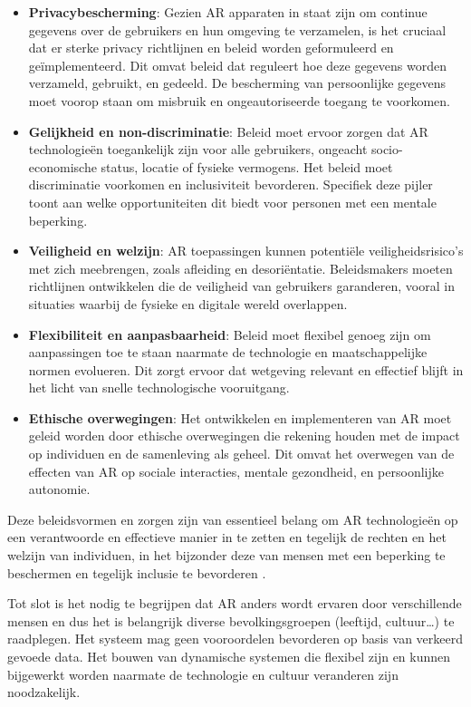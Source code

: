 \begin{itemize}
    \item \textbf{Privacybescherming}: Gezien AR apparaten in staat zijn om continue gegevens over de gebruikers en hun omgeving te verzamelen, is het cruciaal dat er sterke privacy richtlijnen en beleid worden geformuleerd en geïmplementeerd. Dit omvat beleid dat reguleert hoe deze gegevens worden verzameld, gebruikt, en gedeeld. De bescherming van persoonlijke gegevens moet voorop staan om misbruik en ongeautoriseerde toegang te voorkomen.
    \item \textbf{Gelijkheid en non-discriminatie}: Beleid moet ervoor zorgen dat AR technologieën toegankelijk zijn voor alle gebruikers, ongeacht socio-economische status, locatie of fysieke vermogens. Het beleid moet discriminatie voorkomen en inclusiviteit bevorderen. Specifiek deze pijler toont aan welke opportuniteiten dit biedt voor personen met een mentale beperking.
    \item \textbf{Veiligheid en welzijn}: AR toepassingen kunnen potentiële veiligheidsrisico's met zich meebrengen, zoals afleiding en desoriëntatie. Beleidsmakers moeten richtlijnen ontwikkelen die de veiligheid van gebruikers garanderen, vooral in situaties waarbij de fysieke en digitale wereld overlappen.
    \item \textbf{Flexibiliteit en aanpasbaarheid}: Beleid moet flexibel genoeg zijn om aanpassingen toe te staan naarmate de technologie en maatschappelijke normen evolueren. Dit zorgt ervoor dat wetgeving relevant en effectief blijft in het licht van snelle technologische vooruitgang.
    \item \textbf{Ethische overwegingen}: Het ontwikkelen en implementeren van AR moet geleid worden door ethische overwegingen die rekening houden met de impact op individuen en de samenleving als geheel. Dit omvat het overwegen van de effecten van AR op sociale interacties, mentale gezondheid, en persoonlijke autonomie.
\end{itemize}

Deze beleidsvormen en zorgen zijn van essentieel belang om AR technologieën op een verantwoorde en effectieve manier in te zetten en tegelijk de rechten en het welzijn van individuen, in het bijzonder deze van mensen met een beperking te beschermen en tegelijk inclusie te bevorderen \autocite{Roesner2014}.

Tot slot is het nodig te begrijpen dat AR anders wordt ervaren door verschillende mensen en dus het is belangrijk diverse bevolkingsgroepen (leeftijd, cultuur\ldots) te raadplegen. Het systeem mag geen vooroordelen bevorderen op basis van verkeerd gevoede data. Het bouwen van dynamische systemen die flexibel zijn en kunnen bijgewerkt worden naarmate de technologie en cultuur veranderen zijn noodzakelijk. 

